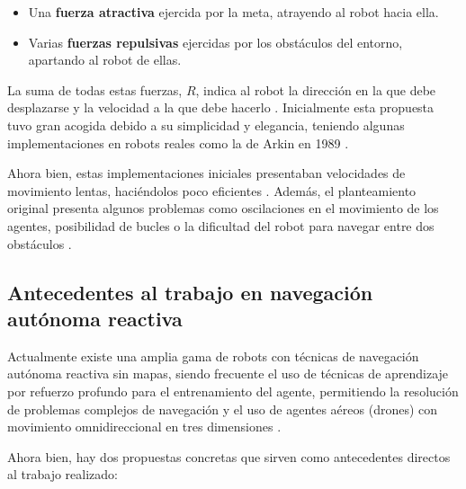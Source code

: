 \begin{itemize}

\item Una \textbf{fuerza atractiva} ejercida por la meta, atrayendo al robot hacia ella.
\item Varias \textbf{fuerzas repulsivas} ejercidas por los obstáculos del entorno, apartando al robot de ellas.

\end{itemize}

La suma de todas estas fuerzas, $R$, indica al robot la dirección en la que debe desplazarse y la velocidad a la que debe hacerlo \cite{131810}. Inicialmente esta propuesta tuvo gran acogida debido a su simplicidad y elegancia, teniendo algunas implementaciones en robots reales como la de Arkin en 1989 \cite{doi:10.1177/027836498900800406}. 

Ahora bien, estas implementaciones iniciales presentaban velocidades de movimiento lentas, haciéndolos poco eficientes \cite{131810}. Además, el planteamiento original presenta algunos problemas como oscilaciones en el movimiento de los agentes, posibilidad de bucles o la dificultad del robot para navegar entre dos obstáculos \cite{131810}.

\subsection{Antecedentes al trabajo en navegación autónoma reactiva}

Actualmente existe una amplia gama de robots con técnicas de navegación autónoma reactiva sin mapas, siendo frecuente el uso de técnicas de aprendizaje por refuerzo profundo para el entrenamiento del agente, permitiendo la resolución de problemas complejos de navegación y el uso de agentes aéreos (drones) con movimiento omnidireccional en tres dimensiones \cite{Sampedro2018}. 

Ahora bien, hay dos propuestas concretas que sirven como antecedentes directos al trabajo realizado:

